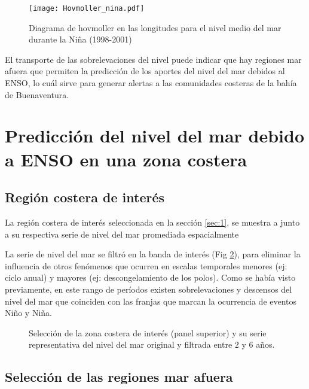 \begin{figure}[h]
	\centering
	\texttt{[image: Hovmoller\_nina.pdf]}
	\caption{Diagrama de hovmoller en las longitudes para el nivel medio del mar durante la Niña (1998-2001)}
	\label{fig:hov_nina}
\end{figure}

El transporte de las sobrelevaciones del nivel puede indicar que hay regiones mar afuera que permiten la predicción de los aportes del nivel del mar debidos al ENSO, lo cuál sirve para generar alertas a las comunidades costeras de la bahía de Buenaventura.
%
\section{Predicción del nivel del mar debido a ENSO en una zona costera}

\subsection{Región costera de interés}

La región costera de interés seleccionada en la sección \ref{sec:1}, se muestra a junto a su respectiva serie de nivel del mar promediada espacialmente

La serie de nivel del mar se filtró en la banda de interés (Fig \ref{fig:Zona costera}), para eliminar la influencia de otros fenómenos que ocurren en escalas temporales menores (ej: ciclo anual) y mayores (ej: descongelamiento de los polos). Como se había visto previamente, en este rango de períodos existen sobrelevaciones y descensos del nivel del mar que coinciden con las franjas que marcan la ocurrencia de eventos Niño y Niña. 
%

\begin{figure}[H]
	\centering
	\vspace{0.1 cm}
	\caption{Selección de la zona costera de interés (panel superior) y su serie representativa del nivel del mar original y filtrada entre 2 y 6 años.}
	\label{fig:Zona costera}
\end{figure}

\subsection{Selección de las regiones mar afuera }

